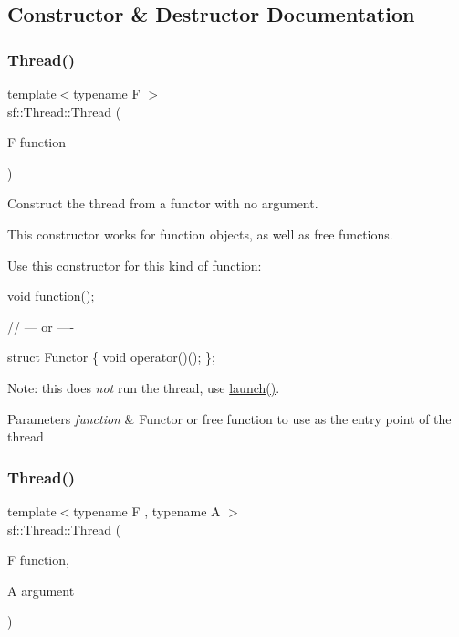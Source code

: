 \subsection{Constructor \& Destructor Documentation}
\mbox{\label{classsf_1_1_thread_a4cc65399bbb111cf8132537783b8e96c}} 
\subsubsection{\texorpdfstring{Thread()}{Thread()}\hspace{0.1cm}{\footnotesize\ttfamily [1/3]}}
{\footnotesize\ttfamily template$<$typename F $>$ \\
sf\+::\+Thread\+::\+Thread (\begin{DoxyParamCaption}\item[{F}]{function }\end{DoxyParamCaption})}



Construct the thread from a functor with no argument. 

This constructor works for function objects, as well as free functions.

Use this constructor for this kind of function\+: 
\begin{DoxyCode}
\textcolor{keywordtype}{void} \textcolor{keyword}{function}();

\textcolor{comment}{// --- or ----}

\textcolor{keyword}{struct }Functor
\{
    \textcolor{keywordtype}{void} operator()();
\};
\end{DoxyCode}
 Note\+: this does {\itshape not} run the thread, use \hyperlink{classsf_1_1_thread_a74f75a9e86e1eb47479496314048b5f6}{launch()}.


\begin{DoxyParams}{Parameters}
{\em function} & Functor or free function to use as the entry point of the thread \\
\hline
\end{DoxyParams}
\mbox{\label{classsf_1_1_thread_a719b2cc067d92d52c35064a49d850a53}} 
\subsubsection{\texorpdfstring{Thread()}{Thread()}\hspace{0.1cm}{\footnotesize\ttfamily [2/3]}}
{\footnotesize\ttfamily template$<$typename F , typename A $>$ \\
sf\+::\+Thread\+::\+Thread (\begin{DoxyParamCaption}\item[{F}]{function,  }\item[{A}]{argument }\end{DoxyParamCaption})}



